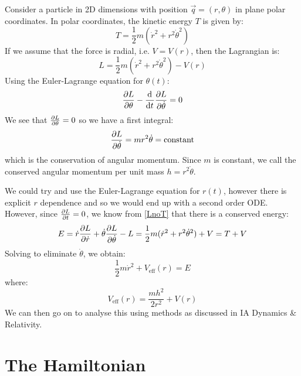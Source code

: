 \documentclass[../main.tex]{subfiles}
\begin{document}
\begin{example}
  Consider a particle in 2D dimensions with position $\vec{q} = (r, \theta)$ in plane polar coordinates.
  In polar coordinates, the kinetic energy $T$ is given by: \label{polarEx}
  \[
    T = \frac{1}{2}m(\dot{r}^2 + r^2 \dot{\theta}^2)
  \]
  If we assume that the force is radial, i.e. $V = V(r)$, then the Lagrangian is:
  \[
    L = \frac{1}{2}m(\dot{r}^2 + r^2 \dot{\theta}^2) - V(r)
  \]
  Using the Euler-Lagrange equation for $\theta(t)$:
  \[
    \pderiv{L}{\theta} - \deriv{}{t} \pderiv{L}{\dot{\theta}} = 0
  \]
  We see that $\pderiv{L}{\theta} = 0$ so we have a first integral:
  \[
    \pderiv{L}{\dot{\theta}} = mr^2 \dot{\theta} = \text{constant}
  \]
  which is the conservation of angular momentum.
  Since $m$ is constant, we call the conserved angular momentum per unit mass $h = r^2 \dot{\theta}$.

  We could try and use the Euler-Lagrange equation for $r(t)$, however there is explicit $r$ dependence and so we would end up with a second order ODE.
  However, since $\pderiv{L}{t} = 0$, we know from \cref{LnoT} that there is a conserved energy:
  \[
    E = \dot{r} \pderiv{L}{\dot{r}} + \dot{\theta} \pderiv{L}{\dot{\theta}} - L = \frac{1}{2}m (\dot{r}^2 + r^2 \dot{\theta}^2) + V = T + V
  \]
  Solving to eliminate $\dot{\theta}$, we obtain:
  \[
    \frac{1}{2} m\dot{r}^2 + V_{\text{eff}}(r) = E
  \]
  where:
  \[
    V_{\text{eff}}(r) = \frac{mh^2}{2r^2} + V(r)
  \]
  We can then go on to analyse this using methods as discussed in IA Dynamics \& Relativity.
\end{example}
\section{The Hamiltonian}
\end{document}
